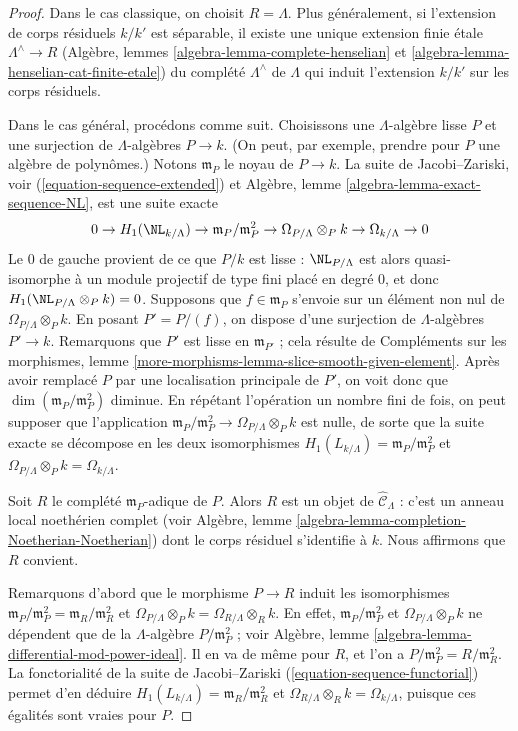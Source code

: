 \begin{proof}
Dans le cas classique, on choisit $R = \Lambda$. Plus généralement, si
l'extension de corps résiduels $k/k'$ est séparable, il existe une unique
extension finie étale $\Lambda^\wedge \to R$ (Algèbre, lemmes
\ref{algebra-lemma-complete-henselian} et
\ref{algebra-lemma-henselian-cat-finite-etale}) du complété
$\Lambda^\wedge$ de $\Lambda$ qui induit l'extension $k/k'$ sur les corps
résiduels.

\medskip\noindent
Dans le cas général, procédons comme suit. Choisissons une $\Lambda$-algèbre
lisse $P$ et une surjection de $\Lambda$-algèbres $P \to k$. (On peut, par
exemple, prendre pour $P$ une algèbre de polynômes.) Notons $\mathfrak m_P$ le
noyau de $P \to k$. La suite de Jacobi--Zariski, voir
(\ref{equation-sequence-extended}) et Algèbre, lemme
\ref{algebra-lemma-exact-sequence-NL}, est une suite exacte
$$
0 \to H_1(\NL_{k/\Lambda}) \to
\mathfrak m_P/\mathfrak m_P^2 \to
\Omega_{P/\Lambda} \otimes_P k \to
\Omega_{k/\Lambda} \to 0
$$
Le $0$ de gauche provient de ce que $P/k$ est lisse :
$\NL_{P/\Lambda}$ est alors quasi-isomorphe à un module projectif de type fini placé
en degré $0$, et donc $H_1(\NL_{P/\Lambda} \otimes_P k) = 0$. Supposons que
$f \in \mathfrak m_P$ s'envoie sur un élément non nul de
$\Omega_{P/\Lambda} \otimes_P k$. En posant $P' = P/(f)$, on dispose d'une
surjection de $\Lambda$-algèbres $P' \to k$. Remarquons que $P'$ est lisse en
$\mathfrak m_{P'}$ ; cela résulte de Compléments sur les morphismes, lemme
\ref{more-morphisms-lemma-slice-smooth-given-element}. Après avoir remplacé
$P$ par une localisation principale de $P'$, on voit donc que
$\dim(\mathfrak m_P/\mathfrak m_P^2)$ diminue. En répétant l'opération un
nombre fini de fois, on peut supposer que l'application
$\mathfrak m_P/\mathfrak m_P^2 \to
\Omega_{P/\Lambda} \otimes_P k$ est nulle, de sorte que la suite exacte se
décompose en les deux isomorphismes
$H_1(L_{k/\Lambda}) = \mathfrak m_P/\mathfrak m_P^2$ et
$\Omega_{P/\Lambda} \otimes_P k = \Omega_{k/\Lambda}$.

\medskip\noindent
Soit $R$ le complété $\mathfrak m_P$-adique de $P$. Alors $R$ est un objet de
$\widehat{\mathcal{C}}_\Lambda$ : c'est un anneau local noethérien complet
(voir Algèbre, lemme
\ref{algebra-lemma-completion-Noetherian-Noetherian}) dont le corps résiduel
s'identifie à $k$. Nous affirmons que $R$ convient.

\medskip\noindent
Remarquons d'abord que le morphisme $P \to R$ induit les isomorphismes
$\mathfrak m_P/\mathfrak m_P^2 = \mathfrak m_R/\mathfrak m_R^2$ et
$\Omega_{P/\Lambda} \otimes_P k = \Omega_{R/\Lambda} \otimes_R k$. En effet,
$\mathfrak m_P/\mathfrak m_P^2$ et
$\Omega_{P/\Lambda} \otimes_P k$ ne dépendent que de la $\Lambda$-algèbre
$P/\mathfrak m_P^2$ ; voir Algèbre, lemme
\ref{algebra-lemma-differential-mod-power-ideal}. Il en va de même pour $R$,
et l'on a $P/\mathfrak m_P^2 = R/\mathfrak m_R^2$. La fonctorialité de la
suite de Jacobi--Zariski (\ref{equation-sequence-functorial}) permet d'en
déduire $H_1(L_{k/\Lambda}) = \mathfrak m_R/\mathfrak m_R^2$ et
$\Omega_{R/\Lambda} \otimes_R k = \Omega_{k/\Lambda}$, puisque ces égalités
sont vraies pour $P$.


\end{proof}
